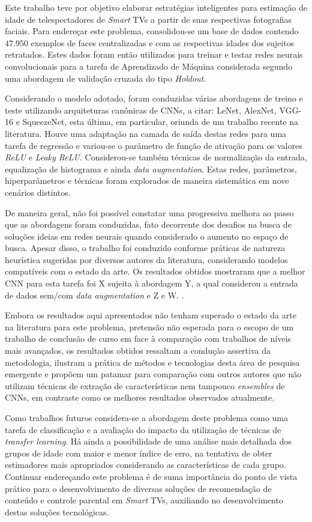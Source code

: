 Este trabalho teve por objetivo elaborar estratégias inteligentes para estimação de idade de telespectadores de  \emph{Smart} TVs a partir de suas respectivas fotografias faciais. Para endereçar este problema, consolidou-se um base de dados contendo $47.950$ exemplos de faces centralizadas e com as respectivas idades dos sujeitos retratados. Estes dados foram então utilizados para treinar e testar redes neurais convolucionais para a tarefa de Aprendizado de Máquina considerada segundo uma abordagem de validação cruzada do tipo \emph{Holdout}.

Considerando o modelo adotado, foram conduzidas várias abordagens de treino e teste utilizando arquiteturas canônicas de CNNs, a citar: LeNet, AlexNet, VGG-16 e SqueezeNet, esta última, em particular, oriunda de um trabalho recente na literatura. Houve uma adaptação na camada de saída destas redes para uma tarefa de regressão e variou-se o parâmetro de função de ativação para os valores \emph{ReLU} e \emph{Leaky ReLU}. Considerou-se também técnicas de normalização da entrada, equalização de histograma e ainda \emph{data augmentation}. Estas redes, parâmetros, hiperparâmetros e técnicas foram explorados de maneira sistemática em nove cenários distintos.

De maneira geral, não foi possível constatar uma progressiva melhora ao passo que as abordagens foram conduzidas, fato decorrente dos desafios na busca de soluções ideias em redes neurais quando considerado o aumento no espaço de busca. Apesar disso, o trabalho foi conduzido conforme práticas de natureza heurística sugeridas por diversos autores da literatura, considerando modelos compatíveis com o estado da arte. Os resultados obtidos mostraram que a melhor CNN para esta tarefa foi X sujeita à abordagem Y, a qual considerou a entrada de dados sem/com \emph{data augmentation} e Z e W. .

Embora os resultados aqui apresentados não tenham superado o estado da arte na literatura para este problema, pretensão não esperada para o escopo de um trabalho de conclusão de curso em face à comparação com trabalhos de níveis mais avançados, os resultados obtidos ressaltam a condução assertiva da metodologia, ilustram a prática de métodos e tecnologias desta área de pesquisa emergente e propõem um patamar para comparação com outros autores que não utilizam técnicas de extração de características nem tampouco \emph{ensembles} de CNNs, em contraste como os melhores resultados observados atualmente.

Como trabalhos futuros considera-se a abordagem deste problema como uma tarefa de classificação e a avaliação do impacto da utilização de técnicas de \emph{transfer learning}. Há ainda a possibilidade de uma análise mais detalhada dos grupos de idade com maior e menor índice de erro, na tentativa de obter estimadores mais apropriados considerando as características de cada grupo.  Continuar endereçando este problema é de suma importância do ponto de vista prático para o desenvolvimento de diversas soluções de recomendação de conteúdo e controle parental em \emph{Smart} TVs, auxiliando no desenvolvimento destas soluções tecnológicas. 
